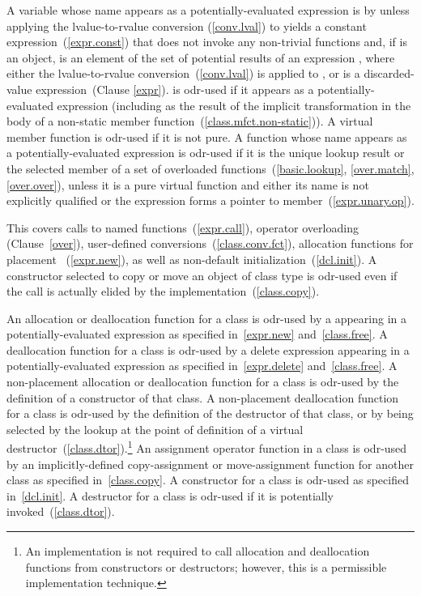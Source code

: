 \pnum
A variable  whose name appears as a
potentially-evaluated expression  is  by  unless
applying the lvalue-to-rvalue conversion (\ref{conv.lval}) to  yields
a constant expression~(\ref{expr.const}) that does not invoke any non-trivial
functions
and, if  is an object,  is an element of
the set of potential results of an expression , where either the lvalue-to-rvalue
conversion~(\ref{conv.lval}) is applied to , or  is
a discarded-value expression~(Clause \ref{expr}).
 is odr-used if it appears as a potentially-evaluated expression
(including as the result of the implicit transformation in the body of a non-static
member function~(\ref{class.mfct.non-static})).
A virtual member
function is odr-used if it is not pure.
A function whose name appears as a potentially-evaluated
expression is odr-used if it is the unique lookup result or the selected
member of a set of overloaded functions~(\ref{basic.lookup}, \ref{over.match}, \ref{over.over}),
unless it is a pure virtual function and either
its name is not explicitly qualified or
the expression forms a pointer to member~(\ref{expr.unary.op}).
\begin{note} This covers calls to named
functions~(\ref{expr.call}), operator overloading (Clause~\ref{over}),
user-defined conversions~(\ref{class.conv.fct}), allocation functions for
placement ~(\ref{expr.new}), as well as non-default
initialization~(\ref{dcl.init}). A constructor selected to copy or move an
object of class type is odr-used even if the
call is actually elided by the implementation~(\ref{class.copy}). \end{note} An allocation
or deallocation function for a class is odr-used by a 
appearing in a potentially-evaluated expression as specified
in~\ref{expr.new} and~\ref{class.free}. A deallocation function for a
class is odr-used by a delete expression appearing in a
potentially-evaluated expression as specified in~\ref{expr.delete}
and~\ref{class.free}. A non-placement allocation or deallocation
function for a class is odr-used by the definition of a constructor of that
class. A non-placement deallocation function for a class is odr-used by the
definition of the destructor of that class, or by being selected by the
lookup at the point of definition of a virtual
destructor~(\ref{class.dtor}).\footnote{An implementation is not required
to call allocation and
deallocation functions from constructors or destructors; however, this
is a permissible implementation technique.}
An assignment operator function in a class is odr-used by an
implicitly-defined
copy-assignment or move-assignment function for another class as specified
in~\ref{class.copy}.
A constructor for a class is odr-used as specified
in~\ref{dcl.init}. A destructor for a class is odr-used if it is potentially
invoked~(\ref{class.dtor}).

